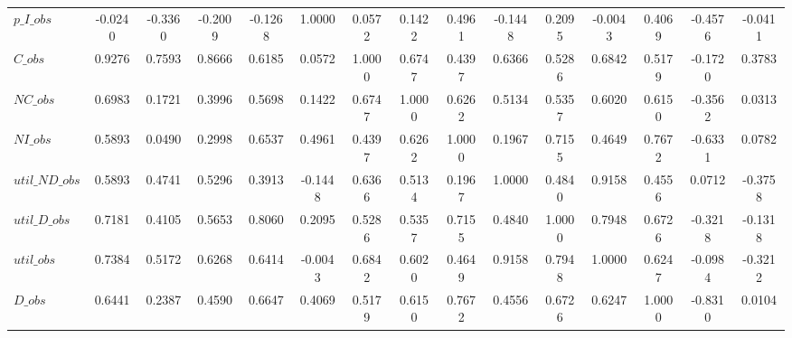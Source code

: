 \begin{center}
\begin{longtable}{lcccccccccccccc}
$p\_I\_obs      $	 & 	          -0.0240	 & 	          -0.3360	 & 	          -0.2009	 & 	          -0.1268	 & 	           1.0000	 & 	           0.0572	 & 	           0.1422	 & 	           0.4961	 & 	          -0.1448	 & 	           0.2095	 & 	          -0.0043	 & 	           0.4069	 & 	          -0.4576	 & 	          -0.0411 \\ 
$C\_obs         $	 & 	           0.9276	 & 	           0.7593	 & 	           0.8666	 & 	           0.6185	 & 	           0.0572	 & 	           1.0000	 & 	           0.6747	 & 	           0.4397	 & 	           0.6366	 & 	           0.5286	 & 	           0.6842	 & 	           0.5179	 & 	          -0.1720	 & 	           0.3783 \\ 
$NC\_obs        $	 & 	           0.6983	 & 	           0.1721	 & 	           0.3996	 & 	           0.5698	 & 	           0.1422	 & 	           0.6747	 & 	           1.0000	 & 	           0.6262	 & 	           0.5134	 & 	           0.5357	 & 	           0.6020	 & 	           0.6150	 & 	          -0.3562	 & 	           0.0313 \\ 
$NI\_obs        $	 & 	           0.5893	 & 	           0.0490	 & 	           0.2998	 & 	           0.6537	 & 	           0.4961	 & 	           0.4397	 & 	           0.6262	 & 	           1.0000	 & 	           0.1967	 & 	           0.7155	 & 	           0.4649	 & 	           0.7672	 & 	          -0.6331	 & 	           0.0782 \\ 
$util\_ND\_obs  $	 & 	           0.5893	 & 	           0.4741	 & 	           0.5296	 & 	           0.3913	 & 	          -0.1448	 & 	           0.6366	 & 	           0.5134	 & 	           0.1967	 & 	           1.0000	 & 	           0.4840	 & 	           0.9158	 & 	           0.4556	 & 	           0.0712	 & 	          -0.3758 \\ 
$util\_D\_obs   $	 & 	           0.7181	 & 	           0.4105	 & 	           0.5653	 & 	           0.8060	 & 	           0.2095	 & 	           0.5286	 & 	           0.5357	 & 	           0.7155	 & 	           0.4840	 & 	           1.0000	 & 	           0.7948	 & 	           0.6726	 & 	          -0.3218	 & 	          -0.1318 \\ 
$util\_obs      $	 & 	           0.7384	 & 	           0.5172	 & 	           0.6268	 & 	           0.6414	 & 	          -0.0043	 & 	           0.6842	 & 	           0.6020	 & 	           0.4649	 & 	           0.9158	 & 	           0.7948	 & 	           1.0000	 & 	           0.6247	 & 	          -0.0984	 & 	          -0.3212 \\ 
$D\_obs         $	 & 	           0.6441	 & 	           0.2387	 & 	           0.4590	 & 	           0.6647	 & 	           0.4069	 & 	           0.5179	 & 	           0.6150	 & 	           0.7672	 & 	           0.4556	 & 	           0.6726	 & 	           0.6247	 & 	           1.0000	 & 	          -0.8310	 & 	           0.0104 \\ 

\end{longtable}
\end{center}
